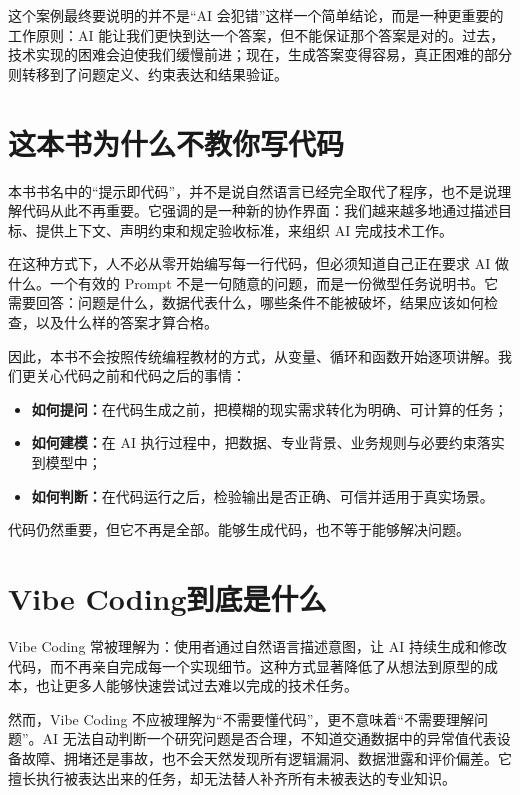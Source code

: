 这个案例最终要说明的并不是“AI 会犯错”这样一个简单结论，而是一种更重要的工作原则：AI 能让我们更快到达一个答案，但不能保证那个答案是对的。过去，技术实现的困难会迫使我们缓慢前进；现在，生成答案变得容易，真正困难的部分则转移到了问题定义、约束表达和结果验证。

\section*{这本书为什么不教你写代码}

本书书名中的“提示即代码”，并不是说自然语言已经完全取代了程序，也不是说理解代码从此不再重要。它强调的是一种新的协作界面：我们越来越多地通过描述目标、提供上下文、声明约束和规定验收标准，来组织 AI 完成技术工作。

在这种方式下，人不必从零开始编写每一行代码，但必须知道自己正在要求 AI 做什么。一个有效的 Prompt 不是一句随意的问题，而是一份微型任务说明书。它需要回答：问题是什么，数据代表什么，哪些条件不能被破坏，结果应该如何检查，以及什么样的答案才算合格。

因此，本书不会按照传统编程教材的方式，从变量、循环和函数开始逐项讲解。我们更关心代码之前和代码之后的事情：

\begin{itemize}
  \item \textbf{如何提问：}在代码生成之前，把模糊的现实需求转化为明确、可计算的任务；
  \item \textbf{如何建模：}在 AI 执行过程中，把数据、专业背景、业务规则与必要约束落实到模型中；
  \item \textbf{如何判断：}在代码运行之后，检验输出是否正确、可信并适用于真实场景。
\end{itemize}

代码仍然重要，但它不再是全部。能够生成代码，也不等于能够解决问题。

\section*{Vibe Coding到底是什么}

Vibe Coding 常被理解为：使用者通过自然语言描述意图，让 AI 持续生成和修改代码，而不再亲自完成每一个实现细节。这种方式显著降低了从想法到原型的成本，也让更多人能够快速尝试过去难以完成的技术任务。

然而，Vibe Coding 不应被理解为“不需要懂代码”，更不意味着“不需要理解问题”。AI 无法自动判断一个研究问题是否合理，不知道交通数据中的异常值代表设备故障、拥堵还是事故，也不会天然发现所有逻辑漏洞、数据泄露和评价偏差。它擅长执行被表达出来的任务，却无法替人补齐所有未被表达的专业知识。


